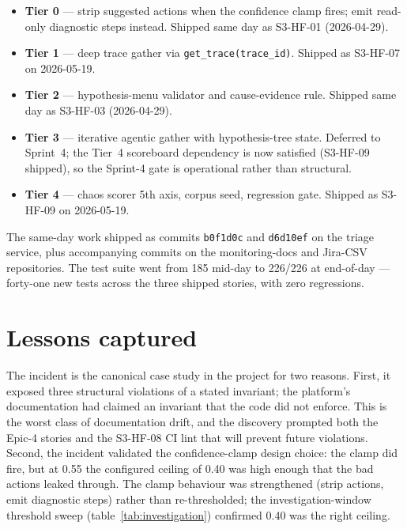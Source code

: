 \documentclass[11pt,a4paper,oneside]{report}
\begin{document}
\begin{itemize}
  \item \textbf{Tier 0} --- strip suggested actions when the confidence
        clamp fires; emit read-only diagnostic steps instead.
        Shipped same day as S3-HF-01 (2026-04-29).
  \item \textbf{Tier 1} --- deep trace gather via
        \texttt{get\_trace(trace\_id)}.  Shipped as S3-HF-07 on
        2026-05-19.
  \item \textbf{Tier 2} --- hypothesis-menu validator and
        cause-evidence rule.  Shipped same day as S3-HF-03
        (2026-04-29).
  \item \textbf{Tier 3} --- iterative agentic gather with
        hypothesis-tree state.  Deferred to Sprint~4; the Tier~4
        scoreboard dependency is now satisfied (S3-HF-09 shipped),
        so the Sprint-4 gate is operational rather than structural.
  \item \textbf{Tier 4} --- chaos scorer 5th axis, corpus seed,
        regression gate.  Shipped as S3-HF-09 on 2026-05-19.
\end{itemize}

The same-day work shipped as commits \texttt{b0f1d0c} and
\texttt{d6d10ef} on the triage service, plus accompanying commits on
the monitoring-docs and Jira-CSV repositories.  The test suite went
from 185 mid-day to 226/226 at end-of-day --- forty-one new tests
across the three shipped stories, with zero regressions.

\section{Lessons captured}

The incident is the canonical case study in the project for two
reasons.  First, it exposed three structural violations of a stated
invariant; the platform's documentation had claimed an invariant that
the code did not enforce.  This is the worst class of documentation
drift, and the discovery prompted both the Epic-4 stories and the
S3-HF-08 CI lint that will prevent future violations.  Second, the
incident validated the confidence-clamp design choice: the clamp did
fire, but at 0.55 the configured ceiling of 0.40 was high enough that
the bad actions leaked through.  The clamp behaviour was strengthened
(strip actions, emit diagnostic steps) rather than re-thresholded;
the investigation-window threshold sweep
(table~\ref{tab:investigation}) confirmed 0.40 was the right ceiling.
\end{document}
